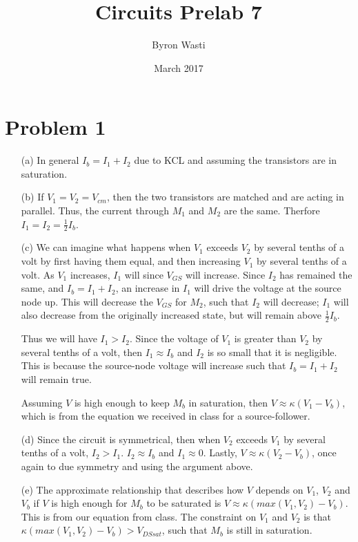 \documentclass{article}
\title{Circuits Prelab 7}
\author{Byron Wasti}
\date{March 2017}
\begin{document}
\maketitle

\section{Problem 1}

\begin{itemize}
    \item[(a)] 
        In general $I_b = I_1 + I_2$ due to KCL and assuming the transistors are in saturation.

    \item[(b)] 
        If $V_1 = V_2 = V_{cm}$, then the two transistors are matched and are acting in parallel. Thus, the current through $M_1$ and $M_2$ are the same. Therfore $I_1 = I_2 = \frac{1}{2}I_b$.

    \item[(c)] 
        We can imagine what happens when $V_1$ exceeds $V_2$ by several tenths of a volt by first having them equal, and then increasing $V_1$ by several tenths of a volt. As $V_1$ increases, $I_1$ will since $V_{GS}$ will increase. Since $I_2$ has remained the same, and $I_b = I_1 + I_2$, an increase in $I_1$ will drive the voltage at the source node up. This will decrease the $V_{GS}$ for $M_2$, such that $I_2$ will decrease; $I_1$ will also decrease from the originally increased state, but will remain above $\frac{1}{2}I_b$. 

        Thus we will have $I_1 > I_2$. Since the voltage of $V_1$ is greater than $V_2$ by several tenths of a volt, then $I_1 \approx I_b$ and $I_2$ is so small that it is negligible. This is because the source-node voltage will increase such that $I_b = I_1 + I_2$ will remain true.

        Assuming $V$ is high enough to keep $M_b$ in saturation, then $V \approx \kappa(V_1 - V_b)$, which is from the equation we received in class for a source-follower.

    \item[(d)]
        Since the circuit is symmetrical, then when $V_2$ exceeds $V_1$ by several tenths of a volt, $I_2 > I_1$. $I_2 \approx I_b$ and $I_1 \approx 0$. Lastly, $V \approx \kappa(V_2 - V_b)$, once again to due symmetry and using the argument above.

    \item[(e)]
        The approximate relationship that describes how $V$ depends on $V_1$, $V_2$ and $V_b$ if $V$ is high enough for $M_b$ to be saturated is $V \approx \kappa(max(V_1, V_2) - V_b)$. This is from our equation from class. The constraint on $V_1$ and $V_2$ is that $\kappa( max(V_1,V_2) - V_b) > V_{DSsat}$, such that $M_b$ is still in saturation.
        
\end{itemize}
\end{document}
